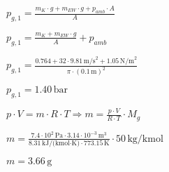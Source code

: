 \( p_{g,1} = \frac{m_K \cdot g + m_{EW} \cdot g + p_{amb} \cdot A}{A} \)  

\( p_{g,1} = \frac{m_K + m_{EW} \cdot g}{A} + p_{amb} \)  

\( p_{g,1} = \frac{0.764 + 32 \cdot 9.81 \, \text{m/s}^2 + 1.05 \, \text{N/m}^2}{\pi \cdot (0.1 \, \text{m})^2} \)  

\( p_{g,1} = 1.40 \, \text{bar} \)  

\( p \cdot V = m \cdot R \cdot T \Rightarrow m = \frac{p \cdot V}{R \cdot T} \cdot M_g \)  

\( m = \frac{7.4 \cdot 10^2 \, \text{Pa} \cdot 3.14 \cdot 10^{-3} \, \text{m}^3}{8.31 \, \text{kJ/(kmol·K)} \cdot 773.15 \, \text{K}} \cdot 50 \, \text{kg/kmol} \)  

\( m = 3.66 \, \text{g} \)